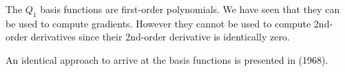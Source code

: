 \begin{remark}
The $Q_1$ basis functions are first-order polynomials. We have seen that they can be used to compute
gradients. However they cannot be used to compute 2nd-order derivatives since their 2nd-order
derivative is identically zero.
\end{remark}

An identical approach to arrive at the basis functions is presented in 
\textcite{eriz68} (1968).

